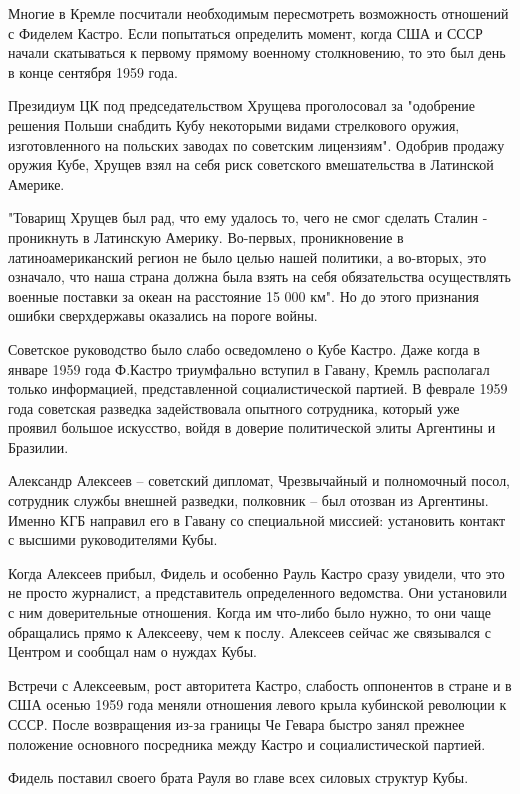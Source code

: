 \documentclass[14pt]{extreport}
\begin{document}
Многие в Кремле посчитали необходимым пересмотреть возможность отношений с Фиделем Кастро. Если попытаться определить момент, когда США и СССР начали скатываться к первому прямому военному столкновению, то это был день в конце сентября 1959 года. 

Президиум ЦК под председательством Хрущева проголосовал за "одобрение решения Польши снабдить Кубу некоторыми видами стрелкового оружия, изготовленного на польских заводах по советским лицензиям". Одобрив продажу оружия Кубе, Хрущев взял на себя риск советского вмешательства в Латинской Америке.

"Товарищ Хрущев был рад, что ему удалось то, чего не смог сделать Сталин - проникнуть в Латинскую Америку. Во-первых, проникновение в латиноамериканский регион не было целью нашей политики, а во-вторых, это означало, что наша страна должна была взять на себя обязательства осуществлять военные поставки за океан на расстояние 15 000 км". Но до этого признания ошибки сверхдержавы оказались на пороге войны.

Советское руководство было слабо осведомлено о Кубе Кастро. Даже когда в январе 1959 года Ф.Кастро триумфально вступил в Гавану, Кремль располагал только информацией, представленной социалистической партией. В феврале 1959 года советская разведка задействовала опытного сотрудника, который уже проявил большое искусство, войдя в доверие политической элиты Аргентины и Бразилии.

Александр Алексеев – советский дипломат, Чрезвычайный и полномочный посол, сотрудник службы внешней разведки, полковник – был отозван из Аргентины. Именно КГБ направил его в Гавану со специальной миссией: установить контакт с высшими руководителями Кубы. 

Когда Алексеев прибыл, Фидель и особенно Рауль Кастро сразу увидели, что это не просто журналист, а представитель определенного ведомства. Они установили с ним доверительные отношения. Когда им что-либо было нужно, то они чаще обращались прямо к Алексееву, чем к послу. Алексеев сейчас же связывался с Центром и сообщал нам о нуждах Кубы.

Встречи с Алексеевым, рост авторитета Кастро, слабость оппонентов в стране и в США осенью 1959 года меняли отношения левого крыла кубинской революции к СССР. После возвращения из-за границы Че Гевара быстро занял прежнее положение основного посредника между Кастро и социалистической партией.

Фидель поставил своего брата Рауля во главе всех силовых структур Кубы.
\end{document}
